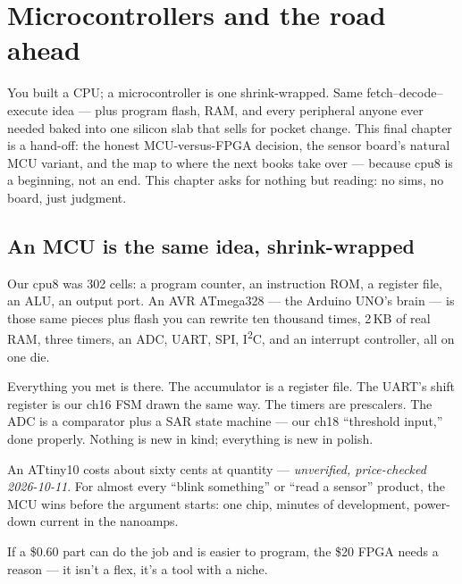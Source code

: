 \chapter{Microcontrollers and the road ahead}\label{ch:mcu}

You built a CPU; a microcontroller is one shrink-wrapped. Same
fetch--decode--execute idea --- plus program flash, RAM, and every
peripheral anyone ever needed baked into one silicon slab that sells
for pocket change. This final chapter is a hand-off: the honest
MCU-versus-FPGA decision, the sensor board's natural MCU variant,
and the map to where the next books take over --- because cpu8 is
a beginning, not an end. This chapter asks for nothing but reading:
no sims, no board, just judgment.

\section{An MCU is the same idea, shrink-wrapped}\label{sec:shrink19}

Our cpu8 was 302 cells: a program counter, an instruction ROM, a
register file, an ALU, an output port. An AVR ATmega328 --- the
Arduino UNO's brain --- is those same pieces plus flash you can
rewrite ten thousand times, 2\,KB of real RAM, three timers, an
ADC, UART, SPI, I\textsuperscript{2}C, and an interrupt controller,
all on one die.

Everything you met is there. The accumulator is a register file.
The UART's shift register is our ch16 FSM drawn the same way.
The timers are prescalers. The ADC is a comparator plus a SAR
state machine --- our ch18 ``threshold input,'' done properly.
Nothing is new in kind; everything is new in polish.

\begin{example}
An ATtiny10 costs about sixty cents at quantity
--- \emph{unverified, price-checked 2026-10-11}. For almost every
``blink something'' or ``read a sensor'' product, the MCU wins
before the argument starts: one chip, minutes of development,
power-down current in the nanoamps.
\end{example}

\begin{checkpoint}
If a \$0.60 part can do the job and is easier to program, the
\$20 FPGA needs a reason --- it isn't a flex, it's a tool with a
niche.
\end{checkpoint}

